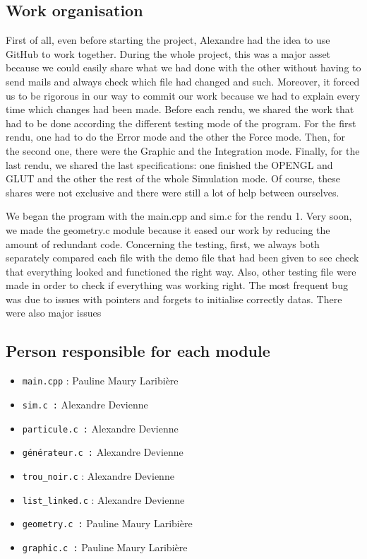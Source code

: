 \documentclass[a4paper]{article} %
\begin{document}
\begin{multicols*}{2}
\subsection{Work organisation}
First of all, even before starting the project,
Alexandre had the idea to use GitHub to work together.
During the whole project, this was a major asset because we could easily share
what we had done with the other without having to send mails
and always check which file had changed and such.
Moreover, it forced us to be rigorous in our way to commit our work
because we had to explain every time which changes had been made.
Before each rendu, we shared the work that had to be done
according the different testing mode of the program.
For the first rendu, one had to do the Error mode and the other the Force mode.
Then, for the second one, there were the Graphic and the Integration mode.
Finally, for the last rendu, we shared the last specifications:
one finished the OPENGL and GLUT
and the other the rest of the whole Simulation mode.
Of course, these shares were not exclusive
and there were still a lot of help between ourselves.

We began the program with the main.cpp and sim.c for the rendu 1.
Very soon, we made the geometry.c module because it eased our work
by reducing the amount of redundant code.
Concerning the testing, first, we always both separately compared each file
with the demo file that had been given to see check that everything looked
and functioned the right way.
Also, other testing file were made in order to check if everything was working right.
The most frequent bug was due to issues with pointers and forgets to initialise correctly datas.
There were also major issues 

\subsection{Person responsible for each module} %
\begin{itemize}
\item \texttt{main.cpp}  :  Pauline Maury Laribière
\item \texttt{sim.c :} Alexandre Devienne
\item \texttt{particule.c :} Alexandre Devienne
\item \texttt{générateur.c :} Alexandre Devienne
\item \texttt{trou\_noir.c} : Alexandre Devienne
\item \texttt{list\_linked.c} : Alexandre Devienne
\item \texttt{geometry.c :} Pauline Maury Laribière
\item \texttt{graphic.c :} Pauline Maury Laribière
\end{itemize}


\end{multicols*}
\end{document}
